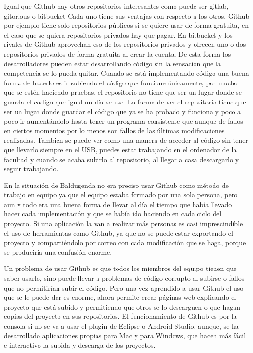 Igual que Github hay otros repositorios interesantes como puede ser gitlab, gitorious o bitbucket
Cada uno tiene sus ventajas con respecto a los otros, Github por ejemplo tiene solo repositorios públicos si se quiere usar de forma gratuita, en el caso que se quiera repositorios privados hay que pagar.
En bitbucket y los rivales de Github aprovechan eso de los repositorios privados y ofrecen uno o dos repositorios privados de forma gratuita al crear la cuenta.
De esta forma los desarrolladores pueden estar desarrollando código sin la sensación que la competencia se lo pueda quitar.
Cuando se está implementando código una buena forma de hacerlo es ir subiendo el código que funcione únicamente, por mucho que se estén haciendo pruebas, el repositorio no tiene que ser un lugar donde se guarda el código que igual un día se use.
La forma de ver el repositorio tiene que ser un lugar donde guardar el código que ya se ha probado y funciona y poco a poco ir aumentándolo hasta tener un programa consistente que aunque de fallos en ciertos momentos por lo menos son fallos de las últimas modificaciones realizadas.
También se puede ver como una manera de acceder al código sin tener que llevarlo siempre en el USB, puedes estar trabajando en el ordenador de la facultad y cuando se acaba subirlo al repositorio, al llegar a casa descargarlo y seguir trabajando.

En la situación de Baldugenda no era preciso usar Github como método de trabajo en equipo ya que el equipo estaba formado por una sola persona, pero aun y todo era una buena forma de llevar al día el tiempo que había llevado hacer cada implementación y que se había ido haciendo en cada ciclo del proyecto.
Si una aplicación la van a realizar más personas es casi imprescindible el uso de herramientas como Github, ya que no se puede estar exportando el proyecto y compartiéndolo por correo con cada modificación que se haga, porque se produciría una confusión enorme.

Un problema de usar Github es que todos los miembros del equipo tienen que saber usarlo, sino puede llevar a problemas de código corrupto al subirse o fallos que no permitirían subir el código. Pero una vez aprendido a usar Github el uso que se le puede dar es enorme, ahora permite crear páginas web explicando el proyecto que está subido y permitiendo que otros se lo descarguen o que hagan copias del proyecto en sus repositorios.
El funcionamiento de Github es por la consola si no se va a usar el plugin de Eclipse o Android Studio, aunque, se ha desarrollado aplicaciones propias para Mac  y para Windows, que hacen más fácil e interactivo la subida y descarga de los proyectos.

